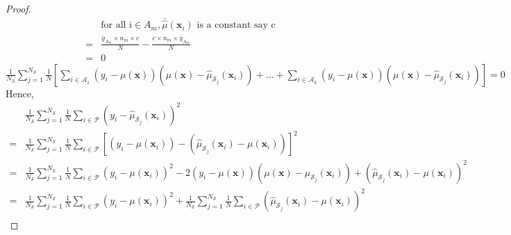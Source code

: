 \documentclass[12pt]{article}
\begin{document}
\begin{proof}
\begin{align*}
    & \text{for all i} \in A_m, \bar {\hat \mu}(\mathbf{x}_i) \text{ is a constant say c}\\
    = & \frac {\bar y_{A_m} \times n_m \times c} {N} - \frac {c \times n_m \times \bar y_{A_m}} {N}\\
    = & 0
\end{align*}
$ \frac{1}{N_\mathcal{S}} \sum_{j=1}^{N_\mathcal{S}} \frac{1}{N} [\sum_{i \in \mathcal{A}_1} (y_i - \mu(\mathbf{x}))(\mu(\mathbf{x}) - \widehat {\mu}_{\mathcal{S}_j}({\mathbf{x}_i})) + \dots +
\sum_{i \in \mathcal{A}_k} (y_i - \mu(\mathbf{x}))(\mu(\mathbf{x}) - \widehat {\mu}_{\mathcal{S}_j}({\mathbf{x}_i}))] = 0$
Hence, 
\begin{align*}
    &\frac{1}{N_{\mathcal{S}}}\sum_{j=1}^{N_\mathcal{S}} \frac{1}{N}\sum_{i \in \mathcal{P}} (y_i - \widehat{\mu}_{\mathcal{S}_j}({\mathbf{x}_i}))^2\\
    = &\frac{1}{N_{\mathcal{S}}}\sum_{j=1}^{N_\mathcal{S}} \frac{1}{N}\sum_{i \in \mathcal{P}} [(y_i - {\mu}({\mathbf{x}_i})) - (\widehat{\mu}_{\mathcal{S}_j}({\mathbf{x}_i}) - {\mu}({\mathbf{x}_i}))]^2\\
    = & \frac{1}{N_\mathcal{S}} \sum_{j=1}^{N_\mathcal{S}} \frac{1}{N} \sum_{i \in \mathcal{P}} (y_i - {\mu}({\mathbf{x}_i}))^2
    - 2 (y_i - \mu(\mathbf{x}))(\mu(\mathbf{x}) - \widehat {\mu}_{\mathcal{S}_j}({\mathbf{x}_i}))
    + (\widehat{\mu}_{\mathcal{S}_j}({\mathbf{x}_i}) - {\mu}({\mathbf{x}_i}))^2\\
    = & \frac{1}{N_\mathcal{S}} \sum_{j=1}^{N_\mathcal{S}} \frac{1}{N} \sum_{i \in \mathcal{P}} (y_i - {\mu}({\mathbf{x}_i}))^2
    + \frac{1}{N_\mathcal{S}} \sum_{j=1}^{N_\mathcal{S}} \frac{1}{N}\sum_{i \in \mathcal{P}} (\widehat{\mu}_{\mathcal{S}_j}({\mathbf{x}_i}) - {\mu}({\mathbf{x}_i}))^2\\
\end{align*}
\end{proof}
\end{document}
